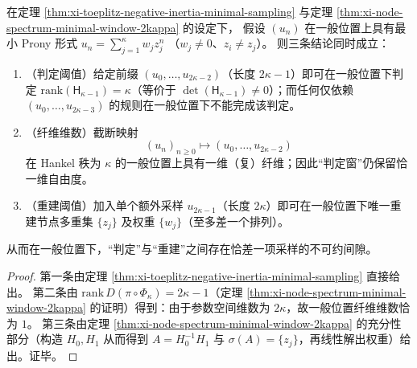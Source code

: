 \begin{corollary}\label{cor:xi-prony-decision-reconstruction-one-sample-gap}
在定理 \ref{thm:xi-toeplitz-negative-inertia-minimal-sampling} 与定理 \ref{thm:xi-node-spectrum-minimal-window-2kappa} 的设定下，
假设 \((u_n)\) 在一般位置上具有最小 Prony 形式
\(
u_n=\sum_{j=1}^{\kappa}w_j z_j^{n}
\)
（\(w_j\neq 0\)、\(z_i\neq z_j\)）。
则三条结论同时成立：
\begin{enumerate}
  \item \textnormal{（判定阈值）}给定前缀 \((u_0,\dots,u_{2\kappa-2})\)（长度 \(2\kappa-1\)）即可在一般位置下判定 \(\mathrm{rank}(\mathsf H_{\kappa-1})=\kappa\)（等价于 \(\det(\mathsf H_{\kappa-1})\neq 0\)）；而任何仅依赖 \((u_0,\dots,u_{2\kappa-3})\) 的规则在一般位置下不能完成该判定。
  \item \textnormal{（纤维维数）}截断映射
  \[
  (u_n)_{n\ge 0}\longmapsto (u_0,\dots,u_{2\kappa-2})
  \]
  在 Hankel 秩为 \(\kappa\) 的一般位置上具有一维（复）纤维；因此“判定窗”仍保留恰一维自由度。
  \item \textnormal{（重建阈值）}加入单个额外采样 \(u_{2\kappa-1}\)（长度 \(2\kappa\)）即可在一般位置下唯一重建节点多重集 \(\{z_j\}\) 及权重 \(\{w_j\}\)（至多差一个排列）。
\end{enumerate}
从而在一般位置下，“判定”与“重建”之间存在恰差一项采样的不可约间隙。
\end{corollary}

\begin{proof}
第一条由定理 \ref{thm:xi-toeplitz-negative-inertia-minimal-sampling} 直接给出。
第二条由 \(\mathrm{rank}\,D(\pi\circ\Phi_\kappa)=2\kappa-1\)（定理 \ref{thm:xi-node-spectrum-minimal-window-2kappa} 的证明）得到：由于参数空间维数为 \(2\kappa\)，故一般位置纤维维数恰为 \(1\)。
第三条由定理 \ref{thm:xi-node-spectrum-minimal-window-2kappa} 的充分性部分（构造 \(H_0,H_1\) 从而得到 \(A=H_0^{-1}H_1\) 与 \(\sigma(A)=\{z_j\}\)，再线性解出权重）给出。证毕。
\end{proof}

